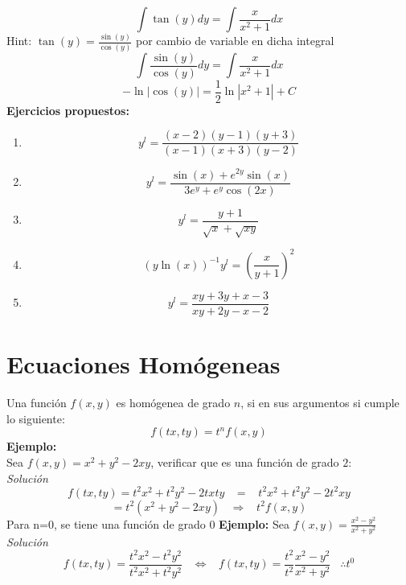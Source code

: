 \documentclass[10pt,executivepaper]{article}
\begin{document}
\[\int \tan(y)dy=\int\frac{x}{x^{2}+1}dx\]
Hint: $\tan(y)=\frac{\sin(y)}{\cos(y)}$ por cambio de variable en dicha integral
\[\int\frac{\sin(y)}{\cos(y)}dy=\int\frac{x}{x^{2}+1}dx\]
\[-\ln\left|\cos(y)\right|=\frac{1}{2}\ln\left|x^{2}+1\right|+C\]
\clearpage
\textbf{Ejercicios propuestos:}
\begin{enumerate}
  \item \[y^{l}=\frac{(x-2)(y-1)(y+3)}{(x-1)(x+3)(y-2)}\]
  \item \[y^{l}=\frac{\sin(x)+e^{2y}\sin(x)}{3e^{y}+e^{y}\cos(2x)}\]
  \item \[y^{l}=\frac{y+1}{\sqrt{x}+\sqrt{xy}}\]
  \item \[\left(y\ln(x)\right)^{-1}y^{l}=\left(\frac{x}{y+1}\right)^{2}\]
  \item \[y^{l}=\frac{xy+3y+x-3}{xy+2y-x-2}\]
\end{enumerate}

\section{Ecuaciones Homógeneas}
Una función $f(x,y)$ es homógenea de grado $n$, si en sus argumentos si cumple lo siguiente:\\
\[f(tx,ty)=t^{n}f(x,y)\]
\textbf{Ejemplo:}
\\Sea $f(x,y)=x^{2}+y^{2}-2xy$, verificar que es una función de grado $2$:\\
\textit{Solución}
\[f(tx,ty)=t^{2}x^{2}+t^{2}y^{2}-2txty\;\;\;=\;\;\;t^{2}x^{2}+t^{2}y^{2}-2t^{2}xy\]
\[=t^{2}(x^{2}+y^{2}-2xy)\;\;\;\Rightarrow\;\;\;t^{2}f(x,y)\]
Para n=0, se tiene una función de grado $0$
\textbf{Ejemplo:}
Sea $f(x,y)=\frac{x^{2}-y^{2}}{x^{2}+y^{2}}$
\textit{Solución}
\[f(tx,ty)=\frac{t^{2}x^{2}-t^{2}y^{2}}{t^{2}x^{2}+t^{2}y^{2}}\;\;\;\Leftrightarrow\;\;\;f(tx,ty)=\frac{t^{2}}{t^{2}}\frac{x^{2}-y^{2}}{x^{2}+y^{2}}\;\;\;\therefore t^{0}\]
\clearpage
\end{document}
